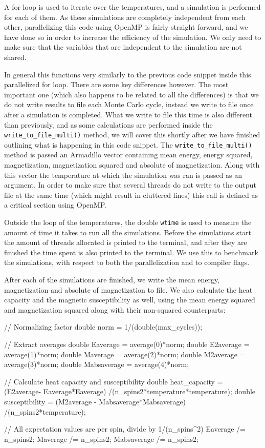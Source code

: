 \documentclass[reprint,english,notitlepage]{revtex4-1}  %
\begin{document}
A for loop is used to iterate over the temperatures, and a simulation is performed for each of them. As these simulations are completely independent from each other, parallelizing this code using OpenMP is fairly straight forward, and we have done so in order to increase the efficiency of the simulation. We only need to make sure that the variables that are independent to the simulation are not shared. 

In general this functions very similarly to the previous code snippet inside this parallelized for loop. There are some key differences however. The most important one (which also happens to be related to all the differences) is that we do not write results to file each Monte Carlo cycle, instead we write to file once after a simulation is completed. What we write to file this time is also different than previously, and as some calculations are performed inside the \verb+write_to_file_multi()+ method, we will cover this shortly after we have finished outlining what is happening in this code snippet. The \verb+write_to_file_multi()+ method is passed an Armadillo \citep{Armadillo} vector containing mean energy, energy squared, magnetization, magnetization squared and absolute of magnetization. Along with this vector the temperature at which the simulation was ran is passed as an argument. In order to make sure that several threads do not write to the output file at the same time (which might result in cluttered lines) this call is defined as a critical section using OpenMP.

Outside the loop of the temperatures, the double \verb+wtime+ is used to measure the amount of time it takes to run all the simulations. Before the simulations start the amount of threads allocated is printed to the terminal, and after they are finished the time spent is also printed to the terminal. We use this to benchmark the simulations, with respect to both the parallelization and to compiler flags.

After each of the simulations are finished, we write the mean energy, magnetization and absolute of magnetization to file. We also calculate the heat capacity and the magnetic susceptibility as well, using the mean energy squared and magnetization squared along with their non-squared counterparts:

\begin{cpp}
// Normalizing factor
double norm = 1/(double(max_cycles));

// Extract averages
double Eaverage = average(0)*norm;
double E2average = average(1)*norm;
double Maverage = average(2)*norm;
double M2average = average(3)*norm;
double Mabsaverage = average(4)*norm;

// Calculate heat capacity and susceptibility
double heat_capacity = (E2average- Eaverage*Eaverage)
					   /(n_spins2*temperature*temperature);
double susceptibility = (M2average - Mabsaverage*Mabsaverage)
					    /(n_spins2*temperature);

// All expectation values are per spin, divide by 1/(n_spins^2)
Eaverage /= n_spins2;
Maverage /= n_spins2;
Mabsaverage /= n_spins2;
\end{cpp}
\end{document}

